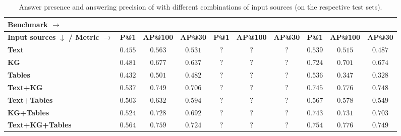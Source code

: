 \begin{table} [t] 
    \centering
    	\begin{tabular}{l G G G H H H c c c} 
        \toprule
            \textbf{Benchmark $\rightarrow$}
                &  
                & 
                &  \\ 
        \midrule
            \textbf{Input sources $\downarrow$ / Metric $\rightarrow$}
                & \textbf{P@1} & \textbf{AP@100}  & \textbf{AP@30}
                & \textbf{P@1} & \textbf{AP@100}  & \textbf{AP@30}
                & \textbf{P@1} & \textbf{AP@100}  & \textbf{AP@30} \\
            \midrule
                \textbf{Text}           &  $0.455$  &  $0.563$  &  $0.531$ &  $?$  &  $?$  &  $?$ &  $0.539$  &  $0.515$  &  $0.487$   \\
                \textbf{KG}             &  $0.481$  &  $0.677$  &  $0.637$ &  $?$  &  $?$  &  $?$ &  $0.724$  &  $0.701$  &  $0.674$   \\
                \textbf{Tables}         &  $0.432$  &  $0.501$  &  $0.482$ &  $?$  &  $?$  &  $?$ &  $0.536$  &  $0.347$  &  $0.328$   \\
            \midrule
                \textbf{Text+KG}        &  $0.537$  &  $0.749$  &  $0.706$ &  $?$  &  $?$  &  $?$ &  $0.745$  &  $\mathbf{0.776}$  &  $0.748$   \\
                \textbf{Text+Tables}    &  $0.503$  &  $0.632$  &  $0.594$ &  $?$  &  $?$  &  $?$ &  $0.567$  &  $0.578$  &  $0.549$   \\
                \textbf{KG+Tables}      &  $0.524$  &  $0.728$  &  $0.692$ &  $?$  &  $?$  &  $?$ &  $ 0.743$  &  $0.731$  &  $0.703$   \\
            \midrule
                \textbf{Text+KG+Tables}    &  $\mathbf{0.564}$  &  $\mathbf{0.759}$  &  $\mathbf{0.724}$ &  $?$ &  $?$  &  $?$ & $\mathbf{0.754}$    & $\mathbf{0.776}$  &  $\mathbf{0.749}$   \\
            \bottomrule
    \end{tabular}
    \vspace*{-0.2cm}
    \caption{Answer presence and answering precision of \method with different combinations of input sources (on the respective test sets).}
    \label{tab:sources}
\end{table}




